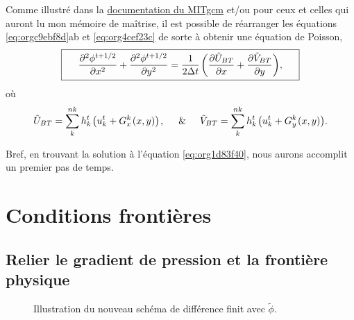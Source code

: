 \documentclass[10pt]{article}
\numberwithin{equation}{section}
\newcommand{\pt}{\hspace{1pt}} %
\begin{document}
Comme illustré dans la \href{http://mitgcm.org/public/r2\_manual/final/online\_documents/node33.html}{documentation du MITgcm} et/ou pour ceux et celles qui auront lu mon mémoire de maîtrise, il est possible de réarranger les équations \ref{eq:orgc9ebf8d}ab et \ref{eq:org4cef23c} de sorte à obtenir une équation de Poisson,
\begin{equation}
\label{eq:org1d83f40}
\boxed{\hspace{0.5cm} \pdv[2]{\phi^{t+1/2}}{x} + \pdv[2]{\phi^{t+1/2}}{y} = \frac{1}{2\Delta t}\pt \qty(\pdv{ \tilde{U}_{BT}}{x} + \pdv{\tilde{V}_{BT}}{y}),\hspace{0.5cm} }
\end{equation}
où
\begin{equation}
\tilde{U}_{BT} = \sum_k^{nk} h_k^t\pt \qty(u^t_k + G^k_x\pt(x,y))\pt,
\hspace{0.5cm}\&\hspace{0.5cm}
\tilde{V}_{BT} = \sum_k^{nk} h^t_k\pt \qty(u^t_k + G^k_y\pt(x,y)).
\end{equation}

Bref, en trouvant la solution à l'équation \ref{eq:org1d83f40}, nous aurons accomplit un premier pas de temps. \newpage

\section{Conditions frontières}
\label{sec:org208b249}

\subsection{Relier le gradient de pression et la frontière physique}
\label{sec:org57595bc}

\begin{wrapfigure}[13]{r}{0.35\textwidth}
\vspace{-\baselineskip}
\centering
{}
\caption{\label{orgfad0503}Illustration du nouveau schéma de différence finit avec \(\tilde{\phi}\).}
\end{wrapfigure}
\end{document}
